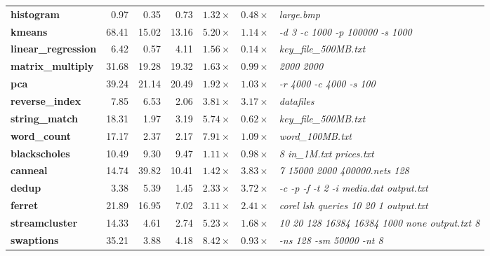 {\begin{table*}[!t]
\begin{tabular}{l|rrr|rr|l}
\hline
{\bf \small histogram} & 0.97 & 0.35 & 0.73 & $1.32\times$ & $0.48\times$ & {\it \small large.bmp} \\
{\bf \small kmeans} & 68.41 & 15.02 & 13.16 & $5.20\times$ & $1.14\times$ & {\it \small -d 3 -c 1000 -p 100000 -s 1000} \\ 
{\bf \small linear\_regression} & 6.42 & 0.57 & 4.11  & $1.56\times$ & $0.14\times$ & {\it \small key\_file\_500MB.txt} \\
{\bf \small matrix\_multiply} & 31.68 & 19.28 & 19.32  & $1.63\times$ & $0.99\times$ & {\it \small 2000 2000 } \\
{\bf \small pca} & 39.24 & 21.14  & 20.49 & $1.92\times$ & $1.03\times$ & {\it \small -r 4000 -c 4000 -s 100 } \\
{\bf \small reverse\_index} & 7.85 & 6.53 & 2.06 & $3.81\times$ & $3.17\times$ & {\it \small datafiles} \\
{\bf \small string\_match} & 18.31 & 1.97 &  3.19 & $5.74\times$ & $0.62\times$ & {\it \small key\_file\_500MB.txt} \\
{\bf \small word\_count} & 17.17 & 2.37 & 2.17 & $7.91\times$ & $1.09\times$ & {\it \small word\_100MB.txt} \\
{\bf \small blackscholes} & 10.49 & 9.30 & 9.47 & $1.11\times$ & $0.98\times$ & {\it \small 8 in\_1M.txt prices.txt} \\
{\bf \small canneal} & 14.74 & 39.82  & 10.41 & $1.42\times$ & $3.83\times$ &  {\it \small 7 15000 2000 400000.nets 128} \\
{\bf \small dedup} & 3.38 & 5.39 & 1.45 & $2.33\times$ & $3.72\times$ & {\it \small -c -p -f -t 2 -i media.dat output.txt} \\
{\bf \small ferret} & 21.89 & 16.95 & 7.02 & $3.11\times$ & $2.41\times$ & {\it \small corel lsh queries 10 20 1 output.txt} \\
{\bf \small streamcluster} & 14.33 & 4.61 & 2.74  & $5.23\times$ & $1.68\times$ &  {\it \small 10 20 128 16384 16384 1000 none output.txt 8} \\
{\bf \small swaptions} & 35.21 & 3.88 & 4.18  & $8.42\times$ & $0.93\times$ & {\it \small -ns 128 -sm 50000 -nt 8} \\

\end{tabular}
\end{table*}}
